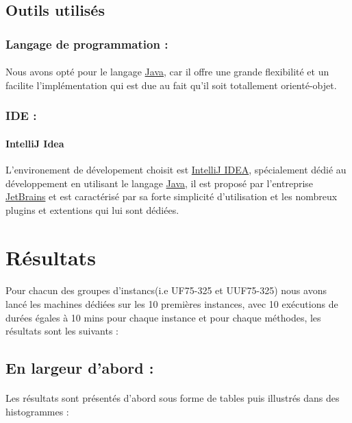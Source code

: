 \subsection{Outils utilisés}
\subsubsection{Langage de programmation : }
\paragraph{}
Nous avons opté pour le langage \href{https://fr.wikipedia.org/wiki/Java_(technique)}{Java}, car il offre une grande flexibilité et un facilite l'implémentation qui est due au fait qu'il soit totallement orienté-objet.
\subsubsection{IDE : }
\paragraph{IntelliJ Idea} L'environement de dévelopement choisit est \href{https://www.jetbrains.com/idea/}{IntelliJ IDEA}, spécialement dédié au développement en utilisant le langage \href{https://fr.wikipedia.org/wiki/Java_(technique)}{Java}, il est proposé par l'entreprise \href{https://www.jetbrains.com}{JetBrains} et est caractérisé par sa forte simplicité d'utilisation et les nombreux plugins et extentions qui lui sont dédiées.

\section{Résultats}\label{tests}
\paragraph{}
Pour chacun des groupes d'instancs(i.e UF75-325 et UUF75-325) nous avons lancé les machines dédiées sur les 10 premières instances, avec 10 exécutions de durées égales à 10 mins pour chaque instance et pour chaque méthodes, les résultats sont les suivants : \\
\subsection{En largeur d'abord :}
\paragraph{}
Les résultats sont présentés d'abord sous forme de tables puis illustrés dans des histogrammes : 
